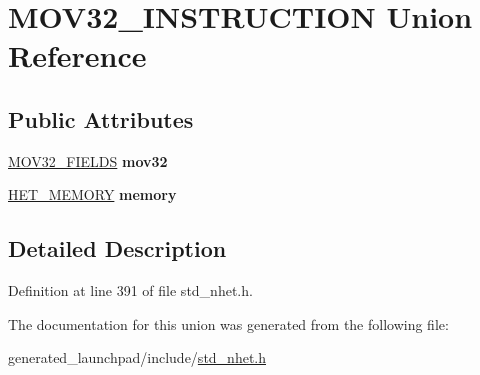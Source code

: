 \hypertarget{unionMOV32__INSTRUCTION}{}\section{M\+O\+V32\+\_\+\+I\+N\+S\+T\+R\+U\+C\+T\+I\+ON Union Reference}
\label{unionMOV32__INSTRUCTION}
\subsection*{Public Attributes}
\begin{DoxyCompactItemize}
\item 
\mbox{\label{unionMOV32__INSTRUCTION_a4b65dcbaf2b024e9dc4e7f5d4f33021b}} 
\mbox{\hyperlink{structMOV32__format}{M\+O\+V32\+\_\+\+F\+I\+E\+L\+DS}} {\bfseries mov32}
\item 
\mbox{\label{unionMOV32__INSTRUCTION_af37be92552e45e1e5dc514546b6d80ed}} 
\mbox{\hyperlink{structmemory__format}{H\+E\+T\+\_\+\+M\+E\+M\+O\+RY}} {\bfseries memory}
\end{DoxyCompactItemize}


\subsection{Detailed Description}


Definition at line 391 of file std\+\_\+nhet.\+h.



The documentation for this union was generated from the following file\+:\begin{DoxyCompactItemize}
\item 
generated\+\_\+launchpad/include/\mbox{\hyperlink{std__nhet_8h}{std\+\_\+nhet.\+h}}\end{DoxyCompactItemize}
